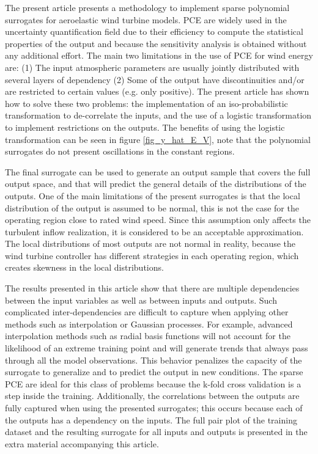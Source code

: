\documentclass[preprint,12pt]{elsarticle}
\begin{document}
The present article presents a methodology to implement sparse polynomial surrogates for aeroelastic wind turbine models. PCE are widely used in the uncertainty quantification field due to their efficiency to compute the statistical properties of the output and because the sensitivity analysis is obtained without any additional effort. The main two limitations in the use of PCE for wind energy are: (1) The input atmospheric parameters are usually jointly distributed with several layers of dependency (2) Some of the output have discontinuities and/or are restricted to certain values (e.g. only positive). The present article has shown how to solve these two problems: the implementation of an iso-probabilistic transformation to de-correlate the inputs, and  the use of a logistic transformation to implement restrictions on the outputs. The benefits of using the logistic transformation can be seen in figure \ref{fig_y_hat_E_V}, note that the polynomial surrogates do not present oscillations in the constant regions.

The final surrogate can be used to generate an output sample that covers the full output space, and that will predict the general details of the distributions of the outputs. One of the main limitations of the present surrogates is that the local distribution of the output is assumed to be normal, this is not the case for the operating region close to rated wind speed. Since this assumption only affects the turbulent inflow realization, it is considered to be an acceptable approximation. The local distributions of most outputs are not normal in reality, because the wind turbine controller has different strategies in each operating region, which creates skewness in the local distributions.

The results presented in this article show that there are multiple dependencies between the input variables as well as between inputs and outputs. Such complicated inter-dependencies are difficult to capture when applying other methods such as interpolation or Gaussian processes. For example, advanced interpolation methods such as radial basis functions will not account for the likelihood of an extreme training point and will generate trends that always pass through all the model observations. This behavior penalizes the capacity of the surrogate to generalize and to predict the output in new conditions. The sparse PCE are ideal for this class of problems because the k-fold cross validation is a step inside the training. Additionally, the correlations between the outputs are fully captured when using the presented surrogates; this occurs because each of the outputs has a dependency on the inputs. The full pair plot of the training dataset and the resulting surrogate for all inputs and outputs is presented in the extra material accompanying this article. %
\end{document}
